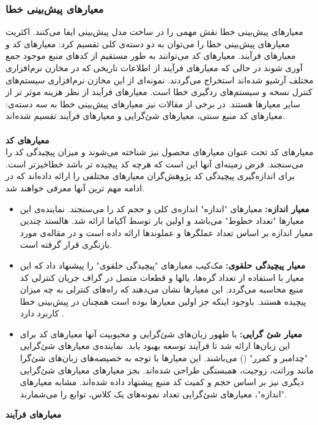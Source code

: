 \subsubsection{معیارهای پیش‌بینی خطا}

معیارهای پیش‌بینی خطا نقش مهمی را در ساخت مدل پیش‌بینی ایفا می‌کنند. اکثریت معیارهای پیش‌بینی خطا را می‌توان به دو دسته‌ی  کلی تقسیم کرد: معیارهای کد و معیارهای فرآیند. معیارهای کد می‌توانند به طور مستقیم از کدهای منبع موجود جمع آوری شوند در حالی که معیارهای فرآیند  از اطلاعات تاریخی که در مخازن نرم‌افزاری مختلف آرشیو شده‌اند استخراج می‌گردند. نمونه‌ای از این مخازن نرم‌افزاری سیستم‌های کنترل نسخه و سیستم‌های ردگیری خطا است. معیار‌های فرآیند از نظر هزینه موثر تر از سایر معیارها هستند\cite{arisholm2010systematic}. در برخی از مقالات نیز معیارهای  پیش‌بینی خطا به سه دسته‌ی: معیارهای کد منبع سنتی، معیارهای شئ‌گرایی و معیارهای فرآیند تقسیم شده‌اند\cite{radjenovic2013software}.\\\\
\textbf{معیارهای کد} \\

معیارهای کد تحت عنوان معیارهای محصول
نیز شناخته می‌شوند و میزان پیچیدگی کد را می‌سنجند. فرض زمینه‌ای آنها این است که هرچه کد پیچیده تر باشد خطا‌خیز‌تر است. برای اندازه‌گیری پیچیدگی کد پژوهش‌گران معیار‌های مختلفی را ارائه داده‌اند که در ادامه   مهم ترین آنها معرفی خواهند شد. 
\begin{itemize}
	\item \textbf{معیار اندازه: }
معیارهای "اندازه" اندازه‌ی کلی و حجم کد را می‌سنجند. نماینده‌ی این معیارها "تعداد خطوط" می‌باشد و اولین بار توسط آکیاما 
 \cite{akiyama1971example}  
 ارائه شد. هالستد
 \cite{halstead1977elements} 
 چندین معیار اندازه بر اساس  تعداد عملگرها و عملوند‌ها ارائه داده است و در مقاله‌ی \cite{pawade2016exploring} مورد بازنگری قرار گرفته است.
\item \textbf{معیار پیچیدگی حلقوی: }
مک‌کیب معیارهای "پیچیدگی حلقوی"
را پیشنهاد داد که این معیار با استفاده از تعداد گره‌ها، یالها و قطعات متصل در گراف جریان کنترلی  کد منبع محاسبه می‌گردد\cite{mccabe1976complexity}. این معیارها نشان می‌دهند که راه‌های کنترلی به چه میزان پیچیده هستند. باوجود اینکه جز اولین معیارها بوده است همچنان در پیش‌بینی خطا کاربرد دارد \cite{malhotra2014comparative}.
\item \textbf{معیار شئ‌ گرایی: }
با ظهور زبان‌های شئ‌گرایی و محبوبیت آنها معیارهای کد  برای این زبان‌ها ارائه شد تا فرآیند توسعه بهبود یابد. نماینده‌ی معیارهای شئ‌گرایی "چدامبر و کمرر" 
() می‌باشند\cite{chidamber1994metrics}. این معیارها با توجه به خصیصه‌های زبان‌های شئ‌گرا مانند وراثت، زوجیت، همبستگی طراحی شده‌اند. بجز معیارهای  معیارهای شئ‌گرایی دیگری نیز بر اساس حجم و کمیت کد منبع پیشنهاد داده شده‌اند. مشابه معیارهای "اندازه"، معیارهای شئ‌گرایی تعداد نمونه‌های یک کلاس، توابع را می‌شمارند. \\
\end{itemize}
\textbf{معیارهای فرآیند} \\

